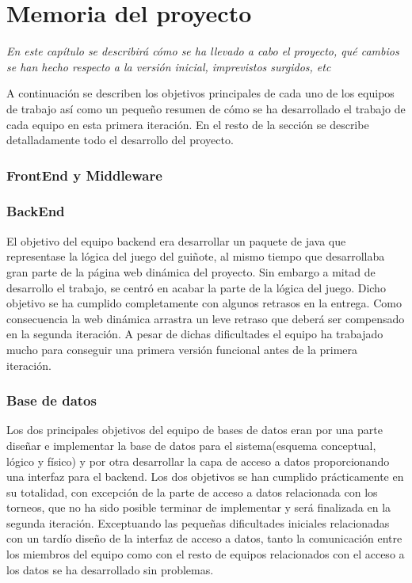 \section{Memoria del proyecto}
\label{memoria}
\emph{En este capítulo se describirá cómo se ha llevado a cabo el proyecto, qué cambios se han hecho respecto a la versión inicial, imprevistos surgidos, etc}

A continuación se describen los objetivos principales de cada uno de los equipos de trabajo así como un pequeño resumen de cómo se ha desarrollado el trabajo de cada equipo en esta primera iteración. En el resto de la sección se describe detalladamente todo el desarrollo del proyecto.\\

\subsubsection*{FrontEnd y Middleware}


\subsubsection*{BackEnd}
El objetivo del equipo backend era desarrollar un paquete de java que representase la lógica del juego del guiñote, al mismo tiempo que desarrollaba gran parte de la página web dinámica del proyecto. Sin embargo a mitad de desarrollo el trabajo, se centró en acabar la parte de la lógica del juego. Dicho objetivo se ha cumplido completamente con algunos retrasos en la entrega. Como consecuencia la web dinámica arrastra un leve retraso que deberá ser compensado en la segunda iteración. A pesar de dichas dificultades el equipo ha trabajado mucho para conseguir una primera versión funcional antes de la primera iteración.

\subsubsection*{Base de datos}
Los dos principales objetivos del equipo de bases de datos eran por una parte diseñar e implementar la base de datos para el sistema(esquema conceptual, lógico y físico) y por otra desarrollar la capa de acceso a datos proporcionando una interfaz para el backend. Los dos objetivos se han cumplido prácticamente en su totalidad, con excepción de la parte de acceso a datos relacionada con los torneos, que no ha sido posible terminar de implementar y será finalizada en la segunda iteración. Exceptuando las pequeñas dificultades iniciales relacionadas con un tardío diseño de la interfaz de acceso a datos, tanto la comunicación entre los miembros del equipo como con el resto de equipos relacionados con el acceso a los datos se ha desarrollado sin problemas.

